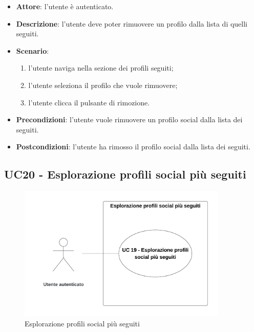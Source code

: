 \begin{itemize}
    \item \textbf{Attore}: l'utente è autenticato.
    \item \textbf{Descrizione}: l'utente deve poter rimuovere un profilo dalla lista di quelli seguiti.
    \item \textbf{Scenario}:
    \begin{enumerate}
        \item l'utente naviga nella sezione dei profili seguiti;
        \item l'utente seleziona il profilo che vuole rimuovere;
        \item l'utente clicca il pulsante di rimozione.
    \end{enumerate}

    \item \textbf{Precondizioni}: l'utente vuole rimuovere un profilo social dalla lista dei seguiti.
    \item \textbf{Postcondizioni}: l'utente ha rimosso il profilo social dalla lista dei seguiti.
\end{itemize}

\subsection{UC20 - Esplorazione profili social più seguiti}

\begin{figure}[!h]
    \includegraphics[width=10cm]{sezioni/Images/UC19.png}
    \centering
    \caption{Esplorazione profili social più seguiti}
\end{figure}

